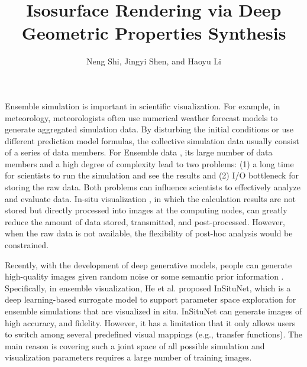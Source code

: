 \documentclass[journal]{vgtc}                %
\title{Isosurface Rendering via Deep Geometric Properties Synthesis}
\author{Neng Shi, Jingyi Shen, and Haoyu Li}
\begin{document}


\maketitle

Ensemble simulation \cite{wang2018visualization} is important in scientific visualization. For example, in meteorology, meteorologists often use numerical weather forecast models to generate aggregated simulation data. By disturbing the initial conditions or use different prediction model formulas, the collective simulation data usually consist of a series of data members. For Ensemble data \cite{ahrens2014situ, ahrens2014image}, its large number of data members and a high degree of complexity lead to two problems: (1) a long time for scientists to run the simulation and see the results and (2) I/O bottleneck for storing the raw data. Both problems can influence scientists to effectively analyze and evaluate data. In-situ visualization \cite{bauer2016situ, ma2009situ}, in which the calculation results are not stored but directly processed into images at the computing nodes, can greatly reduce the amount of data stored, transmitted, and post-processed. However, when the raw data is not available, the flexibility of post-hoc analysis would be constrained.  

Recently, with the development of deep generative models, people can generate high-quality images given random noise \cite{goodfellow2014generative} or some semantic prior information \cite{mirza2014conditional}. Specifically, in ensemble visualization, He et al. \cite{he2019insitunet} proposed InSituNet, which is a deep learning-based surrogate model to support parameter space exploration for ensemble simulations that are visualized in situ. InSituNet can generate images of high accuracy, and fidelity. However, it has a limitation that it only allows users to switch among several predefined visual mappings (e.g., transfer functions). The main reason is covering such a joint space of all possible simulation and visualization parameters requires a large number of training images.
\end{document}
